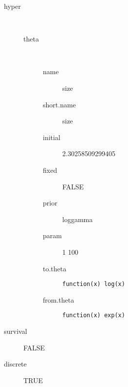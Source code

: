 \begin{description}
	\item[hyper]\ 
	 \begin{description}
	 	\item[theta]\ 
	 	 \begin{description}
	 	 	 \item[ name ] size 
	 	 	 \item[ short.name ] size 
	 	 	 \item[ initial ] 2.30258509299405 
	 	 	 \item[ fixed ] FALSE 
	 	 	 \item[ prior ] loggamma 
	 	 	 \item[ param ] 1 100 
	 	 	 \item[ to.theta ] \verb|function(x) log(x)| 
	 	 	 \item[ from.theta ] \verb|function(x) exp(x)| 
	 	 \end{description}
	 \end{description}
	 \item[ survival ] FALSE 
	 \item[ discrete ] TRUE 
\end{description}
